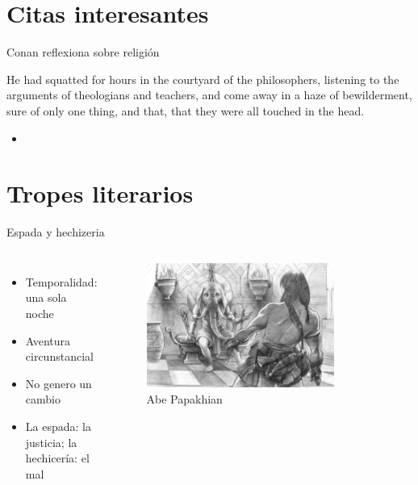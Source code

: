 \section{Citas interesantes}
\note[itemize]{
	\item
}

\begin{frame}{Conan reflexiona sobre religión}
	\begin{exampleblock}{}
		He had squatted for hours in the courtyard of the philosophers, listening to the arguments of theologians and teachers, and come away in a haze of bewilderment, sure of only one thing, and that, that they were all touched in the head.
	\end{exampleblock}

	\begin{itemize}
		\item \textit{  }
	\end{itemize}
\end{frame}
\note[itemize]{
	\item
}


\section{Tropes literarios}
\note[itemize]{
	\item
}

\begin{frame}{Espada y hechizeria}
	\begin{columns}
		\begin{itemize}
			\item Temporalidad: una sola noche
			\item Aventura circunstancial
			\item No genero un cambio
			\item La espada: la justicia; la hechicería: el mal
		\end{itemize}
		\begin{figure}[htb]
			\centering
			\includegraphics[width=0.8\textwidth]{img/tributos/elephant07}
			\caption{Abe Papakhian}
		\end{figure}
	\end{columns}
\end{frame}
\note[itemize]{
	\item
}

